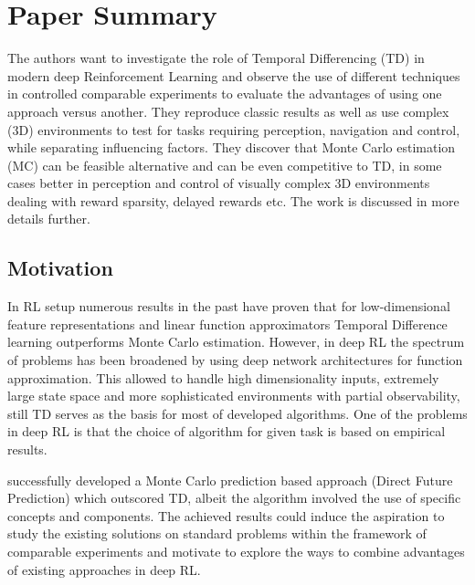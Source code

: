 \documentclass{article}
\begin{document}
    
\section{Paper Summary}
	The authors want to investigate the role of Temporal Differencing (TD) 
    in modern deep Reinforcement Learning and observe the use of
    different techniques in controlled comparable experiments to evaluate the 
    advantages of using one approach versus another.
    They reproduce classic results as well as use 
    complex (3D) environments to test for tasks requiring perception,
    navigation and control, while separating influencing factors. 
    They discover that Monte Carlo estimation 
    (MC) can be feasible alternative and can be even competitive to TD, 
    in some cases better
    in perception and control of visually complex 3D environments 
    dealing with reward sparsity, delayed rewards etc.
    The work is discussed in more details further.

\subsection{Motivation}
	In RL setup numerous results in the past have proven
    that for low-dimensional feature representations and linear function
    approximators Temporal Difference learning outperforms 
    Monte Carlo estimation. However, in deep RL the spectrum of problems  
    has been broadened by using deep network architectures for function
    approximation. This allowed to handle high dimensionality inputs,
    extremely large state space and more sophisticated environments with partial 
    observability, still TD serves as the basis for
    most of developed algorithms. One of the problems in deep RL is that
    the choice of algorithm for given task is based on empirical results.
    
    \citet{DBLP:journals/corr/DosovitskiyK16} successfully developed a Monte Carlo
    prediction based approach (Direct Future Prediction) which outscored TD, 
    albeit the algorithm involved the use of specific concepts and
    components. The achieved results
    could induce the aspiration to study the existing solutions on standard
    problems within the framework of comparable experiments and motivate
    to explore the ways to combine advantages of existing approaches in deep RL.
    
\end{document}
